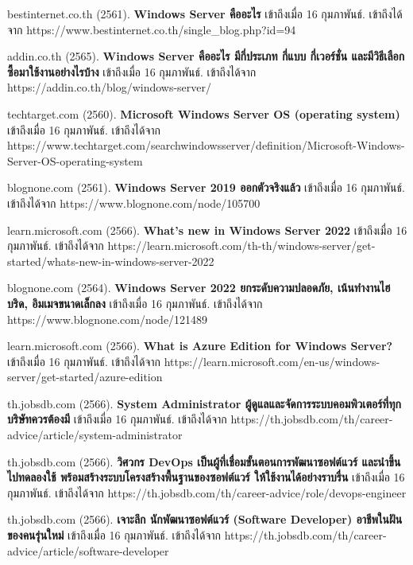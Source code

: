 \begin{thebibliography}{99}

bestinternet.co.th (2561). \textbf{Windows Server คืออะไร} เข้าถึงเมื่อ 16 กุมภาพันธ์. เข้าถึงได้จาก  https://www.bestinternet.co.th/single\_blog.php?id=94

addin.co.th (2565). \textbf{Windows Server คืออะไร มีกี่ประเภท กี่แบบ กี่เวอร์ชั่น และมีวิธีเลือกซื้อมาใช้งานอย่างไรบ้าง} เข้าถึงเมื่อ 16 กุมภาพันธ์. เข้าถึงได้จาก https://addin.co.th/blog/windows-server/

techtarget.com (2560). \textbf{Microsoft Windows Server OS (operating system)} เข้าถึงเมื่อ 16 กุมภาพันธ์. เข้าถึงได้จาก https://www.techtarget.com/searchwindowsserver/definition/Microsoft-Windows-Server-OS-operating-system

blognone.com (2561). \textbf{Windows Server 2019 ออกตัวจริงแล้ว} เข้าถึงเมื่อ 16 กุมภาพันธ์. เข้าถึงได้จาก https://www.blognone.com/node/105700

learn.microsoft.com (2566). \textbf{What's new in Windows Server 2022} เข้าถึงเมื่อ 16 กุมภาพันธ์. เข้าถึงได้จาก
https://learn.microsoft.com/th-th/windows-server/get-started/whats-new-in-windows-server-2022

blognone.com (2564). \textbf{Windows Server 2022 ยกระดับความปลอดภัย, เน้นทำงานไฮบริด, อิมเมจขนาดเล็กลง} เข้าถึงเมื่อ 16 กุมภาพันธ์. เข้าถึงได้จาก
https://www.blognone.com/node/121489

learn.microsoft.com (2566). \textbf{What is Azure Edition for Windows Server?} เข้าถึงเมื่อ 16 กุมภาพันธ์. เข้าถึงได้จาก
https://learn.microsoft.com/en-us/windows-server/get-started/azure-edition 

th.jobsdb.com (2566). \textbf{System Administrator ผู้ดูแลและจัดการระบบคอมพิวเตอร์ที่ทุกบริษัทควรต้องมี} เข้าถึงเมื่อ 16 กุมภาพันธ์. เข้าถึงได้จาก
https://th.jobsdb.com/th/career-advice/article/system-administrator

\clearpage
{}
th.jobsdb.com (2566). \textbf{วิศวกร DevOps เป็นผู้ที่เชื่อมขั้นตอนการพัฒนาซอฟต์แวร์ และนำขึ้นไปทดลองใช้ พร้อมสร้างระบบโครงสร้างพื้นฐานของซอฟต์แวร์ ให้ใช้งานได้อย่างราบรื่น} เข้าถึงเมื่อ 16 กุมภาพันธ์. เข้าถึงได้จาก
https://th.jobsdb.com/th/career-advice/role/devops-engineer


th.jobsdb.com (2566). \textbf{เจาะลึก นักพัฒนาซอฟต์แวร์ (Software Developer) อาชีพในฝันของคนรุ่นใหม่} เข้าถึงเมื่อ 16 กุมภาพันธ์. เข้าถึงได้จาก
https://th.jobsdb.com/th/career-advice/article/software-developer


\end{thebibliography}
